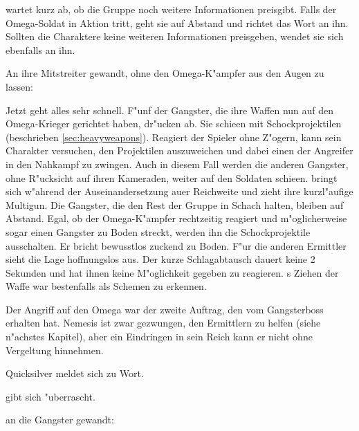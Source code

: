 \xl{} wartet kurz ab, ob die Gruppe noch weitere Informationen preisgibt. Falls der Omega-Soldat in Aktion tritt, geht sie auf Abstand und richtet das Wort an ihn. Sollten die Charaktere keine weiteren Informationen preisgeben, wendet sie sich ebenfalls an ihn.


An ihre Mitstreiter gewandt, ohne den Omega-K"ampfer aus den Augen zu lassen:


Jetzt geht alles sehr schnell. F"unf der Gangster, die ihre Waffen nun auf den Omega-Krieger gerichtet haben, dr"ucken ab. Sie schie\3en mit Schockprojektilen (beschrieben \cref{sec:heavyweapons}). Reagiert der Spieler ohne Z"ogern, kann sein Charakter versuchen, den Projektilen auszuweichen und dabei einen der Angreifer in den Nahkampf zu zwingen. Auch in diesem Fall werden die anderen Gangster, ohne R"ucksicht auf ihren Kameraden, weiter auf den Soldaten schie\3en. \xl{} bringt sich w"ahrend der Auseinandersetzung au\3er Reichweite und zieht ihre kurzl"aufige Multigun. Die Gangster, die den Rest der Gruppe in Schach halten, bleiben auf Abstand. Egal, ob der Omega-K"ampfer rechtzeitig reagiert und m"oglicherweise sogar einen Gangster zu Boden streckt, werden ihn die Schockprojektile ausschalten. Er bricht bewusstlos zuckend zu Boden. F"ur die anderen Ermittler sieht die Lage hoffnungslos aus. Der kurze Schlagabtausch dauert keine 2 Sekunden und hat ihnen keine M"oglichkeit gegeben zu reagieren. \xl{}s Ziehen der Waffe war bestenfalls als Schemen zu erkennen.

Der Angriff auf den Omega war der zweite Auftrag, den \xl{} vom Gangsterboss erhalten hat. Nemesis ist zwar gezwungen, den Ermittlern zu helfen (siehe n"achstes Kapitel), aber ein Eindringen in sein Reich kann er nicht ohne Vergeltung hinnehmen.

Quicksilver meldet sich zu Wort. 


\xl{} gibt sich "uberrascht. 


\xl{} an die Gangster gewandt: 



